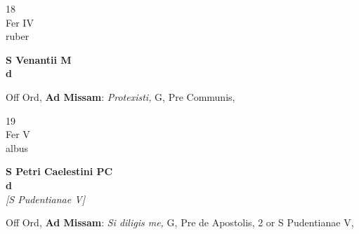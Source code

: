 \documentclass[10pt, openany]{book}
\begin{document}
        \begin{center}
            \begin{minipage}{3.5in}
                \vspace{2em}
                \begin{minipage}{0.5in}
                    {\Huge 18} \\
                    {\normalsize Fer IV} \\
                    {\normalsize ruber}
                \end{minipage}
                \begin{minipage}{3.0in}
                    \textbf{ \large S Venantii M \\
                    \textnormal{\normalsize d}} \\ 
                \end{minipage}
                \begin{justify}Off Ord, \textbf{Ad Missam}: \textit{Protexisti,} G, Pre Communis,   
                \end{justify}
            \end{minipage}
        \end{center}
    
        \begin{center}
            \begin{minipage}{3.5in}
                \vspace{2em}
                \begin{minipage}{0.5in}
                    {\Huge 19} \\
                    {\normalsize Fer V} \\
                    {\normalsize albus}
                \end{minipage}
                \begin{minipage}{3.0in}
                    \textbf{ \large S Petri Caelestini PC \\
                    \textnormal{\normalsize d}} \\ \textit{[S Pudentianae V]} \\ 
                \end{minipage}
                \begin{justify}Off Ord, \textbf{Ad Missam}: \textit{Si diligis me,} G, Pre de Apostolis, 2 or S Pudentianae V,   
                \end{justify}
            \end{minipage}
        \end{center}
    
\end{document}
